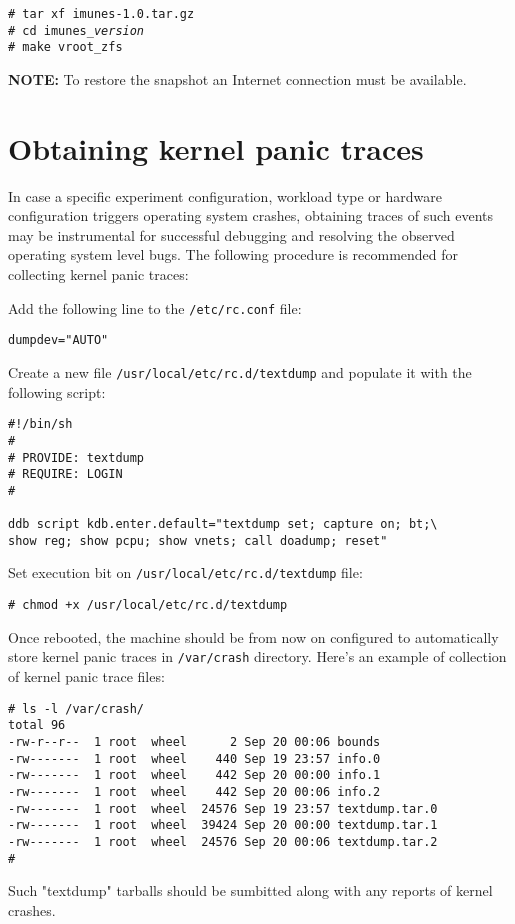 \texttt{\# tar xf imunes-1.0.tar.gz}\\
\texttt{\# cd imunes\_\emph{version}}\\
\texttt{\# make vroot\_zfs}

\textbf{NOTE:} To restore the snapshot an Internet connection must be available.

\section{Obtaining kernel panic traces}

In case a specific experiment configuration, workload type or hardware
configuration triggers operating system crashes, obtaining traces of
such events may be instrumental for successful debugging and resolving
the observed operating system level bugs.  The following procedure is
recommended for collecting kernel panic traces:

Add the following line to the 
\texttt{/etc/rc.conf}
file:

\texttt{dumpdev="AUTO"}

Create a new file
\texttt{/usr/local/etc/rc.d/textdump}
and populate it with the following script:

\begin{verbatim}
#!/bin/sh
#
# PROVIDE: textdump
# REQUIRE: LOGIN
#

ddb script kdb.enter.default="textdump set; capture on; bt;\
show reg; show pcpu; show vnets; call doadump; reset"
\end{verbatim}

Set execution bit on
\texttt{/usr/local/etc/rc.d/textdump}
file:

\begin{verbatim}
# chmod +x /usr/local/etc/rc.d/textdump
\end{verbatim}

Once rebooted, the machine should be from now on configured to automatically
store kernel panic traces in
\texttt{/var/crash}
directory.  Here's an example of collection of kernel panic trace files:

\begin{verbatim}
# ls -l /var/crash/
total 96
-rw-r--r--  1 root  wheel      2 Sep 20 00:06 bounds
-rw-------  1 root  wheel    440 Sep 19 23:57 info.0
-rw-------  1 root  wheel    442 Sep 20 00:00 info.1
-rw-------  1 root  wheel    442 Sep 20 00:06 info.2
-rw-------  1 root  wheel  24576 Sep 19 23:57 textdump.tar.0
-rw-------  1 root  wheel  39424 Sep 20 00:00 textdump.tar.1
-rw-------  1 root  wheel  24576 Sep 20 00:06 textdump.tar.2
# 
\end{verbatim}

Such "textdump" tarballs should be sumbitted along with any reports of
kernel crashes.
